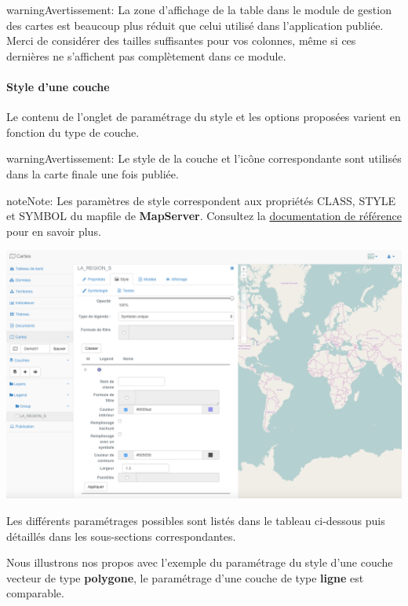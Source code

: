 \documentclass[letterpaper,10pt,french]{sphinxmanual}
\begin{document}
\begin{notice}{warning}{Avertissement:}
La zone d'affichage de la table dans le module de gestion des
cartes est beaucoup plus réduit que celui utilisé dans
l'application publiée. Merci de considérer des tailles suffisantes
pour vos colonnes, même si ces dernières ne s'affichent pas
complètement dans ce module.
\end{notice}


\paragraph{Style d'une couche}
\label{maps/layerstree:style-d-une-couche}
Le contenu de l'onglet de paramétrage du style et les options
proposées varient en fonction du type de couche.

\begin{notice}{warning}{Avertissement:}
Le style de la couche et l'icône correspondante sont utilisés dans la carte finale une fois publiée.
\end{notice}

\begin{notice}{note}{Note:}
Les paramètres de style correspondent aux propriétés CLASS, STYLE et SYMBOL du mapfile de \textbf{MapServer}. Consultez la \href{http://mapserver.org/mapfile/index.html}{documentation de référence} pour en savoir plus.
\end{notice}

\includegraphics[width=1.000\linewidth]{set-style-window.png}

Les différents paramétrages possibles sont listés dans le tableau
ci-dessous puis détaillés dans les sous-sections correspondantes.

Nous illustrons nos propos avec l'exemple du paramétrage du style
d'une couche vecteur de type \textbf{polygone}, le paramétrage d'une couche
de type \textbf{ligne} est comparable.
\end{document}
